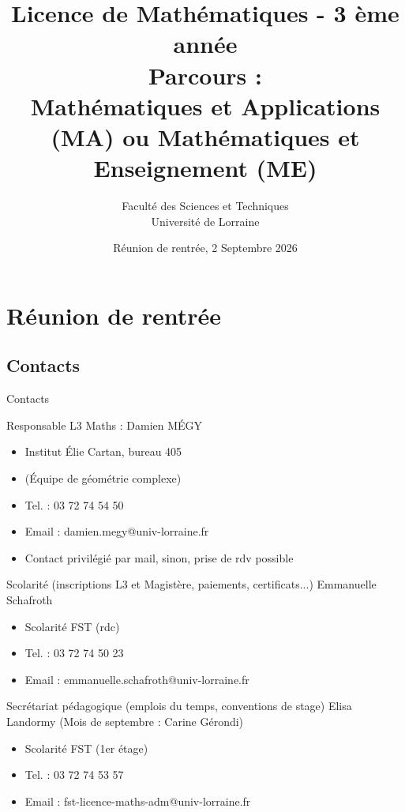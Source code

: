 \documentclass{beamer}
\title[3 ème année, S5 Automne]
{Licence de Mathématiques - 3 ème année\\
Parcours : \\
Mathématiques et Applications (MA)  ou Mathématiques et Enseignement (ME)}%
\author[Licence de Mathématiques]{Faculté des Sciences et Techniques \\
Université de Lorraine  }
\date[02.09.25]{Réunion de rentrée, 2 Septembre 2026}
\begin{document}
 
\begin{frame}
\maketitle
\end{frame}

 

\section{Réunion de rentrée}

\subsection{Contacts}
\begin{frame}{Contacts}

\begin{block}{Responsable L3 Maths : }
Damien MÉGY
\begin{itemize}
\item Institut Élie Cartan, bureau 405
\item (Équipe de géométrie complexe)
\item Tel. : 03 72 74 54 50
\item Email :  damien.megy@univ-lorraine.fr
\item Contact privilégié par mail, sinon, prise de rdv possible
 \end{itemize}
\end{block}
 
 
 \end{frame}

\begin{frame}
\begin{block}{Scolarité (inscriptions L3 et Magistère, paiements, certificats...)}
Emmanuelle Schafroth
\begin{itemize}
\item Scolarité FST (rdc)
\item Tel. :  03 72 74 50 23
 \item Email :  emmanuelle.schafroth@univ-lorraine.fr
 \end{itemize}
\end{block}
\begin{block}{Secrétariat pédagogique (emplois du temps, conventions de stage)}
Elisa Landormy (Mois de septembre : Carine Gérondi)
\begin{itemize}
\item Scolarité FST  (1er étage)
\item Tel. :  03 72 74 53 57
 \item Email :  fst-licence-maths-adm@univ-lorraine.fr
 \end{itemize}
\end{block}

\end{frame}
\end{document}
